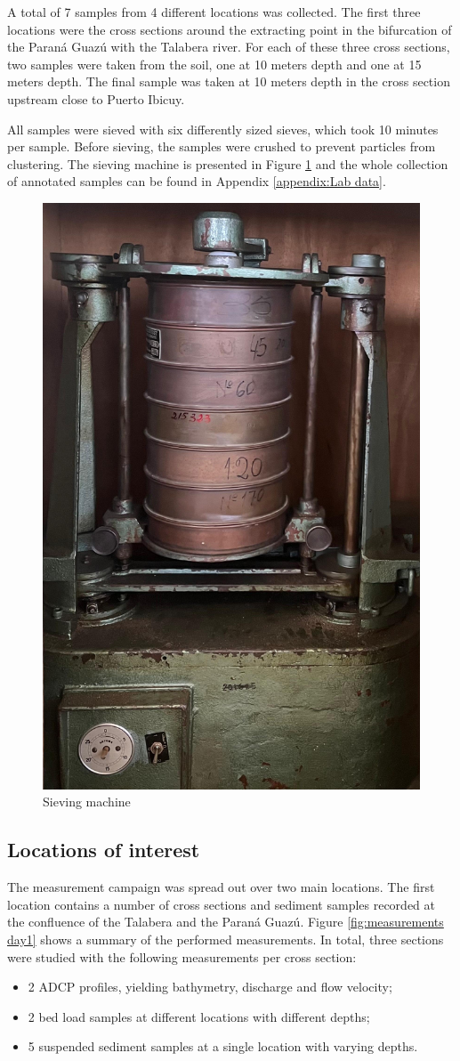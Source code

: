 A total of 7 samples from 4 different locations was collected. The first three locations were the cross sections around the extracting point in the bifurcation of the Paraná Guazú with the Talabera river. For each of these three cross sections, two samples were taken from the soil, one at 10 meters depth and one at 15 meters depth. The final sample was taken at 10 meters depth in the cross section upstream close to Puerto Ibicuy. 



All samples were sieved with six differently sized sieves, which took 10 minutes per sample. Before sieving, the samples were crushed to prevent particles from clustering. The sieving machine is presented in Figure \ref{fig:siev} and the whole collection of annotated samples can be found in Appendix \ref{appendix:Lab data}.

\begin{figure}[H]
    \centering
    \includegraphics[width=0.35\linewidth]{figures//ch3/siev.jpeg}
    \caption{Sieving machine}
    \label{fig:siev}
\end{figure}

\subsection{Locations of interest}
The measurement campaign was spread out over two main locations. The first location contains a number of cross sections and sediment samples recorded at the confluence of the Talabera and the Paraná Guazú. Figure \ref{fig:measurements day1} shows a summary of the performed measurements. In total, three sections were studied with the following measurements per cross section:
\begin{itemize}
    \item 2 ADCP profiles, yielding bathymetry, discharge and flow velocity;
    \item 2 bed load samples at different locations with different depths;
    \item 5 suspended sediment samples at a single location with varying depths.
\end{itemize}

